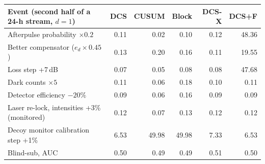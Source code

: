 \begin{tabular}{lrrrrr}
\hline
Event (second half of a 24-h stream, $d=1$) & DCS & CUSUM & Block & DCS-X & DCS+F\\
\hline
Afterpulse probability $\times0.2$ & 0.11 & 0.02 & 0.10 & 0.12 & 48.36\\
Better compensator ($e_d\times0.45$) & 0.13 & 0.20 & 0.16 & 0.11 & 19.55\\
Loss step +7\,dB & 0.07 & 0.05 & 0.08 & 0.08 & 47.68\\
Dark counts $\times5$ & 0.11 & 0.06 & 0.18 & 0.10 & 0.11\\
Detector efficiency $-20\%$ & 0.09 & 0.06 & 0.16 & 0.09 & 0.09\\
Laser re-lock, intensities +3\% (monitored) & 0.12 & 0.07 & 0.13 & 0.12 & 0.12\\
Decoy monitor calibration step +1\% & 6.53 & 49.98 & 49.98 & 7.33 & 6.53\\
\hline
Blind-sub, AUC & 0.50 & 0.49 & 0.49 & 0.51 & 0.50\\
\hline
\end{tabular}